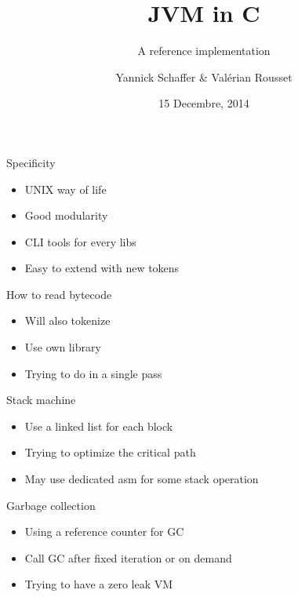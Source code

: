 \documentclass{beamer}
\title{JVM in C}
\subtitle{A reference implementation}
\author{Yannick Schaffer \& Val\'erian Rousset}
\date{15 Decembre, 2014}
\begin{document}
	\maketitle

	\begin{frame}{Specificity}
		\begin{itemize}
			\item UNIX way of life
			\item Good modularity
			\item CLI tools for every libs
			\item Easy to extend with new tokens
		\end{itemize}
	\end{frame}

	\begin{frame}{How to read bytecode}
		\begin{itemize}
			\item Will also tokenize
			\item Use own library
			\item Trying to do in a single pass
		\end{itemize}
	\end{frame}

	\begin{frame}{Stack machine}
		\begin{itemize}
			\item Use a linked list for each block
			\item Trying to optimize the critical path
			\item May use dedicated asm for some stack operation
		\end{itemize}
	\end{frame}

	\begin{frame}{Garbage collection}
		\begin{itemize}
			\item Using a reference counter for GC
			\item Call GC after fixed iteration or on demand
			\item Trying to have a zero leak VM
		\end{itemize}
	\end{frame}
\end{document}
